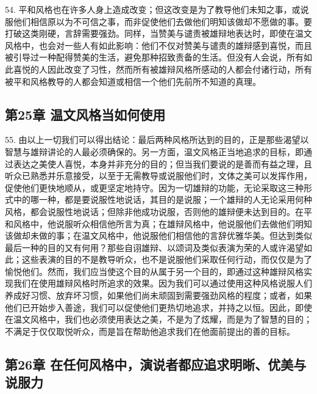 54. 平和风格也在许多人身上造成改变；但这改变是为了教导他们未知之事，或说服他们相信原以为不可信之事，而非促使他们去做他们明知该做却不愿做的事。要打破这类刚硬，言辞需要强劲。同样，当赞美与谴责被雄辩地表达时，即使在温文风格中，也会对一些人有如此影响：他们不仅对赞美与谴责的雄辩感到喜悦，而且被引导过一种配得赞美的生活，避免那种招致责备的生活。但没有人会说，所有如此喜悦的人因此改变了习性，然而所有被雄辩风格所感动的人都会付诸行动，所有被平和风格教导的人都会知道或相信一个他们先前所不知道的真理。\par


\subsection{第25章 温文风格当如何使用}

55. 由以上一切我们可以得出结论：最后两种风格所达到的目的，正是那些渴望以智慧与雄辩讲论的人最必须确保的。另一方面，温文风格正当地追求的目标，即通过表达之美使人喜悦，本身并非充分的目的；但当我们要说的是善而有益之理，且听众已熟悉并乐意接受，以至于无需教导或说服他们时，文体之美可以发挥作用，促使他们更快地顺从，或更坚定地持守。因为一切雄辩的功能，无论采取这三种形式中的哪一种，都是要说服性地说话，其目的是说服；一个雄辩的人无论采用何种风格，都会说服性地说话；但除非他成功说服，否则他的雄辩便未达到目的。在平和风格中，他说服听众相信他所言为真；在雄辩风格中，他说服他们去做他们明知该做却未做的事；在温文风格中，他说服他们相信他的言辞优雅华美。但达到类似最后一种的目的又有何用？那些自诩雄辩、以颂词及类似表演为荣的人或许渴望如此；这些表演的目的不是教导听众，也不是说服他们采取任何行动，而仅仅是为了愉悦他们。然而，我们应当使这个目的从属于另一个目的，即通过这种雄辩风格实现我们在使用雄辩风格时所追求的效果。因为我们可以通过使用这种风格说服人们养成好习惯、放弃坏习惯，如果他们尚未顽固到需要强劲风格的程度；或者，如果他们已开始步入善途，我们可以促使他们更热切地追求，并持之以恒。因此，即使在温文风格中，我们也必须使用表达之美，不是为了炫耀，而是为了智慧的目的；不满足于仅仅取悦听众，而是旨在帮助他追求我们在他面前提出的善的目标。\par


\subsection{第26章 在任何风格中，演说者都应追求明晰、优美与说服力}

